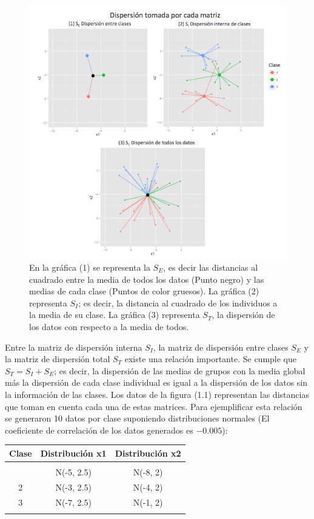 \begin{figure}[!ht]
  \centering
	\includegraphics[width=1\textwidth]{Figures/Chapter2_SE_SI}	
  \caption[Distancias en las matrices de dispersión]
  {En la gráfica (1) se representa la $S_E$, es decir las distancias al cuadrado entre la media de todos los datos (Punto negro) y las medias de cada clase (Puntos de color gruesos). La gráfica (2) representa $S_I$; es decir, la distancia al cuadrado de los individuos a la media de su clase. La gráfica (3) representa $S_T$, la dispersión de los datos con respecto a la media de todos.}
\end{figure}

Entre la matriz de dispersión interna $S_I$, la matriz de dispersión entre clases $S_E$ y la matriz de dispersión total $S_T$ existe una relación importante. Se cumple que $S_T = S_I + S_E $; es decir, la dispersión de las medias de grupos con la media global más la dispersión de cada clase individual es igual a la dispersión de los datos sin la información de las clases. Los datos de la figura (1.1) representan las distancias que toman en cuenta cada una de estas matrices. Para ejemplificar esta relación se generaron 10 datos por clase suponiendo distribuciones normales (El coeficiente de correlación de los datos generados es $-0.005$):

\begin{center}
\begin{tabular}{ c c c}
\toprule
\textbf{Clase} & \textbf{Distribución x1} & \textbf{Distribución x2} \\
\midrule\\
\addlinespace[-2ex]
1 & N(-5, 2.5) & N(-8, 2)\\
2 & N(-3, 2.5) & N(-4, 2)\\
3 & N(-7, 2.5) & N(-1, 2) \\
\addlinespace[1.5ex]
\bottomrule
\end{tabular}
\end{center}

